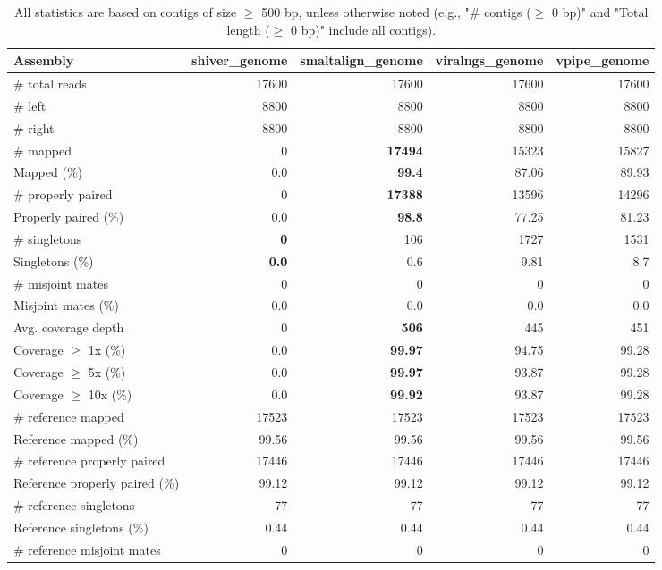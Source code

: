 \documentclass[12pt,a4paper]{article}
\begin{document}
\begin{table}[ht]
\begin{center}
\caption{All statistics are based on contigs of size $\geq$ 500 bp, unless otherwise noted (e.g., "\# contigs ($\geq$ 0 bp)" and "Total length ($\geq$ 0 bp)" include all contigs).}
\begin{tabular}{|l*{4}{|r}|}
\hline
Assembly & shiver\_genome & smaltalign\_genome & viralngs\_genome & vpipe\_genome \\ \hline
\# total reads & 17600 & 17600 & 17600 & 17600 \\ \hline
\# left & 8800 & 8800 & 8800 & 8800 \\ \hline
\# right & 8800 & 8800 & 8800 & 8800 \\ \hline
\# mapped & 0 & {\bf 17494} & 15323 & 15827 \\ \hline
Mapped (\%) & 0.0 & {\bf 99.4} & 87.06 & 89.93 \\ \hline
\# properly paired & 0 & {\bf 17388} & 13596 & 14296 \\ \hline
Properly paired (\%) & 0.0 & {\bf 98.8} & 77.25 & 81.23 \\ \hline
\# singletons & {\bf 0} & 106 & 1727 & 1531 \\ \hline
Singletons (\%) & {\bf 0.0} & 0.6 & 9.81 & 8.7 \\ \hline
\# misjoint mates & 0 & 0 & 0 & 0 \\ \hline
Misjoint mates (\%) & 0.0 & 0.0 & 0.0 & 0.0 \\ \hline
Avg. coverage depth & 0 & {\bf 506} & 445 & 451 \\ \hline
Coverage $\geq$ 1x (\%) & 0.0 & {\bf 99.97} & 94.75 & 99.28 \\ \hline
Coverage $\geq$ 5x (\%) & 0.0 & {\bf 99.97} & 93.87 & 99.28 \\ \hline
Coverage $\geq$ 10x (\%) & 0.0 & {\bf 99.92} & 93.87 & 99.28 \\ \hline
\# reference mapped & 17523 & 17523 & 17523 & 17523 \\ \hline
Reference mapped (\%) & 99.56 & 99.56 & 99.56 & 99.56 \\ \hline
\# reference properly paired & 17446 & 17446 & 17446 & 17446 \\ \hline
Reference properly paired (\%) & 99.12 & 99.12 & 99.12 & 99.12 \\ \hline
\# reference singletons & 77 & 77 & 77 & 77 \\ \hline
Reference singletons (\%) & 0.44 & 0.44 & 0.44 & 0.44 \\ \hline
\# reference misjoint mates & 0 & 0 & 0 & 0 \\ \hline

\end{tabular}
\end{center}
\end{table}
\end{document}
